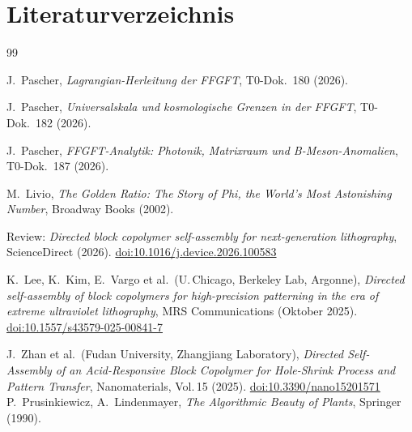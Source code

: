 \section*{Literaturverzeichnis}

\begin{thebibliography}{99}

J.~Pascher, \textit{Lagrangian-Herleitung der FFGFT}, T0-Dok.~180 (2026).

J.~Pascher, \textit{Universalskala und kosmologische Grenzen in der FFGFT},
T0-Dok.~182 (2026).

J.~Pascher, \textit{FFGFT-Analytik: Photonik, Matrixraum und B-Meson-Anomalien},
T0-Dok.~187 (2026).

M.~Livio, \textit{The Golden Ratio: The Story of Phi, the World's Most
Astonishing Number}, Broadway Books (2002).

Review: \textit{Directed block copolymer self-assembly for next-generation lithography},
ScienceDirect (2026).
\href{https://doi.org/10.1016/j.device.2026.100583}{doi:10.1016/j.device.2026.100583}

K.~Lee, K.~Kim, E.~Vargo et al.\ (U.\,Chicago, Berkeley Lab, Argonne),
\textit{Directed self-assembly of block copolymers for high-precision patterning
in the era of extreme ultraviolet lithography},
MRS Communications (Oktober 2025).
\href{https://doi.org/10.1557/s43579-025-00841-7}{doi:10.1557/s43579-025-00841-7}

J.~Zhan et al.\ (Fudan University, Zhangjiang Laboratory),
\textit{Directed Self-Assembly of an Acid-Responsive Block Copolymer
for Hole-Shrink Process and Pattern Transfer},
Nanomaterials, Vol.\,15 (2025).
\href{https://doi.org/10.3390/nano15201571}{doi:10.3390/nano15201571}
P.~Prusinkiewicz, A.~Lindenmayer,
\textit{The Algorithmic Beauty of Plants},
Springer (1990).

\end{thebibliography}
